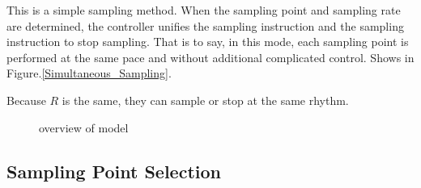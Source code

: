 \documentclass[conference,compsoc]{IEEEtran}
\begin{document}
This is a simple sampling method. When the sampling point and sampling rate are determined, the controller unifies the sampling instruction and the sampling instruction to stop sampling. That is to say, in this mode, each sampling point is performed at the same pace and without additional complicated control. Shows in Figure.\ref{Simultaneous_Sampling}.

Because $R $ is the same, they can sample or stop at the same rhythm.



\begin{figure}[!!!!!!!!!!!!!!hhhhhhhhhht]
\centering
{}
\caption{overview of model}
\label{fig_1_model}
\end{figure}

\subsection{Sampling Point Selection} 
\end{document}

